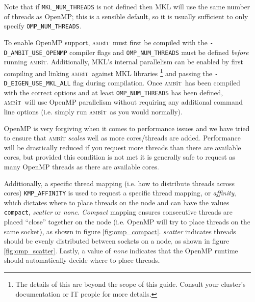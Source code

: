\documentclass{report}
\newcommand{\ambit}{\textsc{amb}{\footnotesize i}\textsc{t}}
\begin{document}
Note that if \texttt{MKL\_NUM\_THREADS} is not defined then MKL will use the same number of threads as 
OpenMP; this is a sensible default, so it is usually sufficient to only specify 
\texttt{OMP\_NUM\_THREADS}. 

To enable OpenMP support, \ambit\ must first be compiled with the \texttt{-D\_AMBIT\_USE\_OPENMP} compiler
flags and \texttt{OMP\_NUM\_THREADS} must be defined \emph{before} running \ambit. Additionally, MKL's
internal parallelism can be enabled by first compiling and linking \ambit\ against MKL libraries%
\footnote{The details of this are beyond the scope of this guide. Consult your cluster's documentation or
IT people for more details.} and passing the \texttt{-D\_EIGEN\_USE\_MKL\_ALL} flag during compilation.
Once \ambit\ has been compiled with the correct options and at least \texttt{OMP\_NUM\_THREADS} has been
defined, \ambit\ will use OpenMP parallelism without requiring any additional command line options (i.e.
simply run \ambit\ as you would normally).

OpenMP is very forgiving when it comes to performance issues and we have tried to ensure that \ambit
\textit{scales} well as more cores/threads are added. Performance will be drastically reduced if you
request more threads than there are available cores, but provided this condition is not met it is
generally safe to request as many OpenMP threads as there are available cores.

Additionally, a specific thread mapping (i.e. how to distribute threads across cores)
\texttt{KMP\_AFFINITY} is used to request a specific thread mapping, or
\textit{affinity}, which dictates where to place threads on the node and can have the values 
\texttt{compact}, \textit{scatter} or \textit{none}. \textit{Compact} mapping ensures consecutive 
threads are placed ``close'' together on the node (i.e. OpenMP will try to place threads on the same 
socket), as shown in figure \ref{fig:omp_compact}. 
\textit{scatter} indicates threads should be evenly distributed between sockets on a node, as shown in
figure \ref{fig:omp_scatter}.
Lastly, a value of \textit{none} indicates that the OpenMP runtime should automatically decide where to 
place threads.
\end{document}
